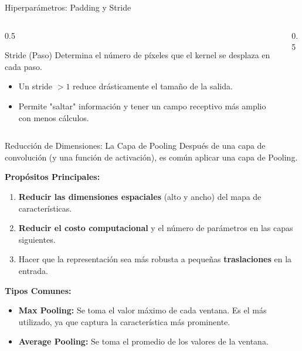 \documentclass[aspectratio=169, 10pt]{beamer}
\begin{document}
\begin{frame}{Hiperparámetros: Padding y Stride}

	
	\begin{columns}[T]
		\begin{column}{0.5\textwidth}
			\begin{block}{Stride (Paso)}
			Determina el número de píxeles que el kernel se desplaza en cada paso.
		
			\begin{itemize}
				\item Un stride $> 1$ reduce drásticamente el tamaño de la salida.
				\item Permite "saltar" información y tener un campo receptivo más amplio con menos cálculos.
			\end{itemize}
			\end{block}
		\end{column}
		
		\begin{column}{0.5\textwidth}
			
				\begin{center}
				\end{center}

		\end{column}
	\end{columns}
\end{frame}

\begin{frame}{Reducción de Dimensiones: La Capa de Pooling}
	Después de una capa de convolución (y una función de activación), es común aplicar una capa de Pooling.
	
	\textbf{Propósitos Principales:}
	\begin{enumerate}
		\item \textbf{Reducir las dimensiones espaciales} (alto y ancho) del mapa de características.
		\item \textbf{Reducir el costo computacional} y el número de parámetros en las capas siguientes.
		\item Hacer que la representación sea más robusta a pequeñas \textbf{traslaciones} en la entrada.
	\end{enumerate}
	
	\textbf{Tipos Comunes:}
	\begin{itemize}
		\item \textbf{Max Pooling:} Se toma el valor máximo de cada ventana. Es el más utilizado, ya que captura la característica más prominente.
		\item \textbf{Average Pooling:} Se toma el promedio de los valores de la ventana.
	\end{itemize}
\end{frame}
\end{document}
